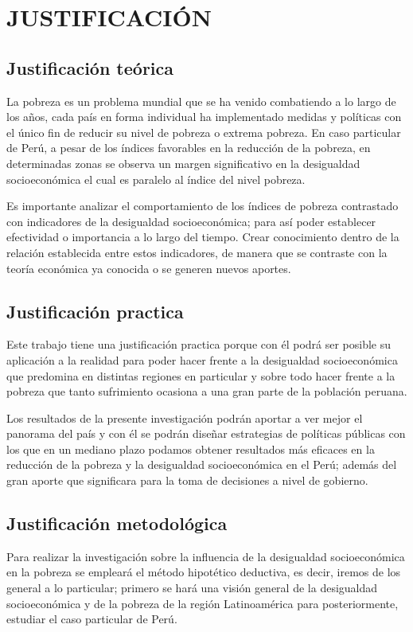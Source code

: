 \section{\large JUSTIFICACIÓN}

\subsection{Justificación teórica}
	
La pobreza es un problema mundial que se ha venido combatiendo a lo largo de los años, cada país en forma individual ha implementado medidas y políticas con el único fin de reducir su nivel de pobreza o extrema pobreza. En caso particular de Perú, a pesar de los índices favorables en la reducción de la pobreza, en determinadas zonas se observa un margen significativo en la desigualdad socioeconómica el cual es paralelo al índice del nivel pobreza.

Es importante analizar el comportamiento de los índices de pobreza contrastado con indicadores de la desigualdad socioeconómica; para así poder establecer efectividad o importancia a lo largo del tiempo. Crear conocimiento dentro de la relación establecida entre estos indicadores, de manera que se contraste con la teoría económica ya conocida o se generen nuevos aportes.


\subsection{Justificación practica}

Este trabajo tiene una justificación practica porque con él podrá ser posible su aplicación a la realidad para poder hacer frente a la desigualdad socioeconómica que predomina en distintas regiones en particular y sobre todo hacer frente a la pobreza que tanto sufrimiento ocasiona a una gran parte de la población peruana. 

Los resultados de la presente investigación podrán aportar a ver mejor el panorama del país y con él se podrán diseñar estrategias de políticas públicas con los que en un mediano plazo podamos obtener resultados más eficaces en la reducción de la pobreza y la desigualdad socioeconómica en el Perú; además del gran aporte que significara para la toma de decisiones a nivel de gobierno.

\subsection{Justificación metodológica}

Para realizar la investigación sobre la influencia de la desigualdad socioeconómica en la pobreza se empleará el método hipotético deductiva, es decir, iremos de los general a lo particular; primero se hará una visión general de la desigualdad socioeconómica y de la pobreza de la región Latinoamérica para posteriormente, estudiar el caso particular de Perú.










		

